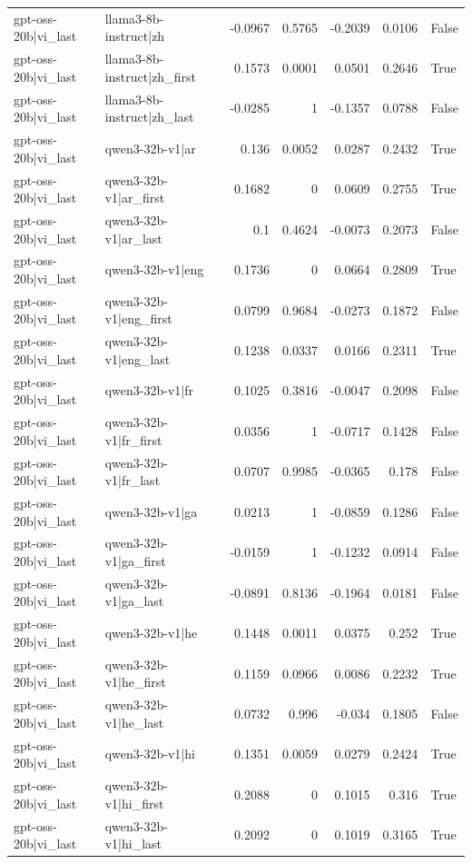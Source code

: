 \begin{table}
\begin{tabular}{l l r r r r l}
gpt-oss-20b|vi_last & llama3-8b-instruct|zh & -0.0967 & 0.5765 & -0.2039 & 0.0106 & False \\
gpt-oss-20b|vi_last & llama3-8b-instruct|zh_first & 0.1573 & 0.0001 & 0.0501 & 0.2646 & True \\
gpt-oss-20b|vi_last & llama3-8b-instruct|zh_last & -0.0285 & 1 & -0.1357 & 0.0788 & False \\
gpt-oss-20b|vi_last & qwen3-32b-v1|ar & 0.136 & 0.0052 & 0.0287 & 0.2432 & True \\
gpt-oss-20b|vi_last & qwen3-32b-v1|ar_first & 0.1682 & 0 & 0.0609 & 0.2755 & True \\
gpt-oss-20b|vi_last & qwen3-32b-v1|ar_last & 0.1 & 0.4624 & -0.0073 & 0.2073 & False \\
gpt-oss-20b|vi_last & qwen3-32b-v1|eng & 0.1736 & 0 & 0.0664 & 0.2809 & True \\
gpt-oss-20b|vi_last & qwen3-32b-v1|eng_first & 0.0799 & 0.9684 & -0.0273 & 0.1872 & False \\
gpt-oss-20b|vi_last & qwen3-32b-v1|eng_last & 0.1238 & 0.0337 & 0.0166 & 0.2311 & True \\
gpt-oss-20b|vi_last & qwen3-32b-v1|fr & 0.1025 & 0.3816 & -0.0047 & 0.2098 & False \\
gpt-oss-20b|vi_last & qwen3-32b-v1|fr_first & 0.0356 & 1 & -0.0717 & 0.1428 & False \\
gpt-oss-20b|vi_last & qwen3-32b-v1|fr_last & 0.0707 & 0.9985 & -0.0365 & 0.178 & False \\
gpt-oss-20b|vi_last & qwen3-32b-v1|ga & 0.0213 & 1 & -0.0859 & 0.1286 & False \\
gpt-oss-20b|vi_last & qwen3-32b-v1|ga_first & -0.0159 & 1 & -0.1232 & 0.0914 & False \\
gpt-oss-20b|vi_last & qwen3-32b-v1|ga_last & -0.0891 & 0.8136 & -0.1964 & 0.0181 & False \\
gpt-oss-20b|vi_last & qwen3-32b-v1|he & 0.1448 & 0.0011 & 0.0375 & 0.252 & True \\
gpt-oss-20b|vi_last & qwen3-32b-v1|he_first & 0.1159 & 0.0966 & 0.0086 & 0.2232 & True \\
gpt-oss-20b|vi_last & qwen3-32b-v1|he_last & 0.0732 & 0.996 & -0.034 & 0.1805 & False \\
gpt-oss-20b|vi_last & qwen3-32b-v1|hi & 0.1351 & 0.0059 & 0.0279 & 0.2424 & True \\
gpt-oss-20b|vi_last & qwen3-32b-v1|hi_first & 0.2088 & 0 & 0.1015 & 0.316 & True \\
gpt-oss-20b|vi_last & qwen3-32b-v1|hi_last & 0.2092 & 0 & 0.1019 & 0.3165 & True \\

\end{tabular}
\end{table}
